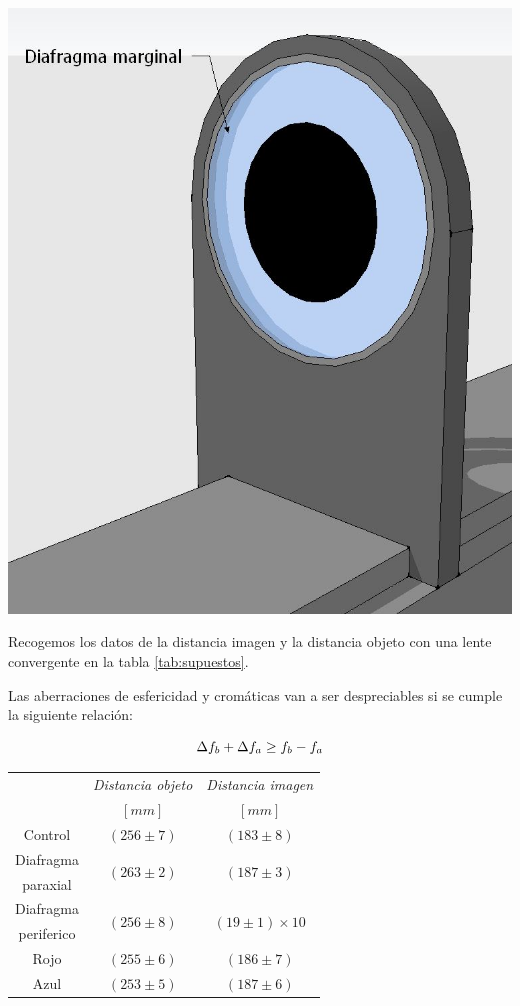 \documentclass[a4paper,12pt]{article}
\newenvironment{Figure}
  {\par\medskip\noindent\minipage{\linewidth}}
  {\endminipage\par\medskip}
\begin{document}
\begin{multicols*}{2}
        \begin{Figure}
            \centering
            \includegraphics[width=0.7\linewidth]{DiafragmaMarginal.jpg}
            \label{f: Dmarg}
        \end{Figure}

        Recogemos los datos de la distancia imagen y la distancia objeto con una lente convergente en la tabla \ref{tab:supuestos}.

        Las aberraciones de esfericidad y cromáticas van a ser despreciables si se cumple la siguiente relación:

        \begin{equation}
            \centering
            \Delta f_{b} + \Delta f_{a} \geq f_{b} - f_{a}
        \end{equation}
 
        \begin{Figure}
            \centering

            \begin{tabular}{c|c c}
                \toprule
                 & \textit{Distancia objeto} & \textit{Distancia imagen}\\
                 & \textit{$[mm]$} & \textit{$[mm]$}\\
                \midrule
                Control & $(256 \pm 7)$ &$(183 \pm 8)$\\ \hline
                Diafragma & \multirow{2}{*}{$(263 \pm 2)$} & \multirow{2}{*}{$(187 \pm 3)$}\\
                paraxial & & \\
                Diafragma & \multirow{2}{*}{$(256 \pm 8)$} & \multirow{2}{*}{$(19 \pm 1)\times 10$}\\
                periferico & & \\ \hline
                Rojo & $(255 \pm 6)$ &$(186 \pm 7)$\\
                Azul & $(253 \pm 5)$ &$(187 \pm 6)$\\ 
                \bottomrule
            \end{tabular}


\end{Figure}
\end{multicols*}
\end{document}

